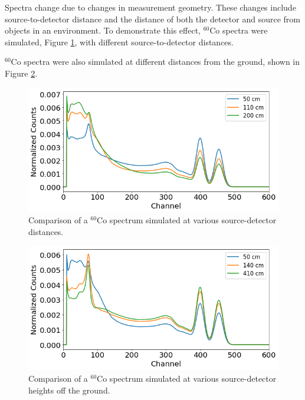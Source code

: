 Spectra change due to changes in measurement geometry. These changes include source-to-detector distance and the distance of both the detector and source from objects in an environment. To demonstrate this effect, $^{60}$Co spectra were simulated, Figure \ref{fig:sim_spectra_distance_comparison}, with different source-to-detector distances.

$^{60}$Co spectra were also simulated at different distances from the ground, shown in Figure \ref{fig:sim_spectra_height_comparison}.



\begin{figure}[H]
\centering
\includegraphics[width=0.95\linewidth]{images/sim_spectra_distance_comparison}
\caption{Comparison of a $^{60}$Co spectrum simulated at various source-detector distances.}
\label{fig:sim_spectra_distance_comparison}
\end{figure}

\begin{figure}[H]
\centering
\includegraphics[width=0.95\linewidth]{images/sim_spectra_height_comparison}
\caption{Comparison of a $^{60}$Co spectrum simulated at various source-detector heights off the ground.}
\label{fig:sim_spectra_height_comparison}
\end{figure}



